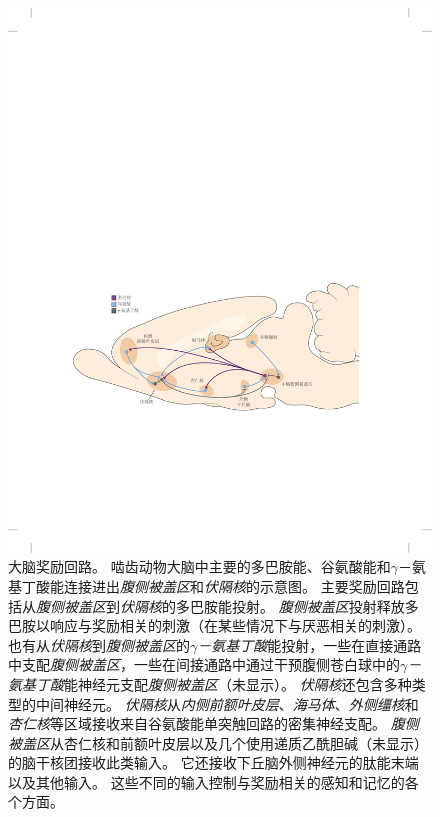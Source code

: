 \begin{figure}[htbp]
	\centering
	\includegraphics[width=0.95\linewidth]{chap43/fig_43_3}
	\caption{大脑奖励回路。
		啮齿动物大脑中主要的多巴胺能、谷氨酸能和$\gamma$－氨基丁酸能连接进出\textit{腹侧被盖区}和\textit{伏隔核}的示意图。
		主要奖励回路包括从\textit{腹侧被盖区}到\textit{伏隔核}的多巴胺能投射。
		\textit{腹侧被盖区}投射释放多巴胺以响应与奖励相关的刺激（在某些情况下与厌恶相关的刺激）。
		也有从\textit{伏隔核}到\textit{腹侧被盖区}的\textit{$\gamma$－氨基丁酸}能投射，一些在直接通路中支配\textit{腹侧被盖区}，一些在间接通路中通过干预腹侧苍白球中的\textit{$\gamma$－氨基丁酸}能神经元支配\textit{腹侧被盖区}（未显示）。
		\textit{伏隔核}还包含多种类型的中间神经元。
		\textit{伏隔核}从\textit{内侧前额叶皮层}、\textit{海马体}、\textit{外侧缰核}和\textit{杏仁核}等区域接收来自谷氨酸能单突触回路的密集神经支配。
		\textit{腹侧被盖区}从杏仁核和前额叶皮层以及几个使用递质乙酰胆碱（未显示）的脑干核团接收此类输入。
		它还接收下丘脑外侧神经元的肽能末端以及其他输入。
		这些不同的输入控制与奖励相关的感知和记忆的各个方面\cite{russo2013brain}。}
	\label{fig:43_3}
\end{figure}


